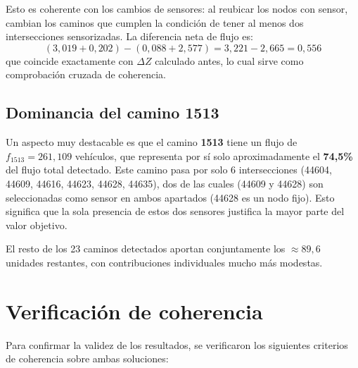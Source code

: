 \documentclass[12pt,a4paper]{article}
\begin{document}
Esto es coherente con los cambios de sensores: al reubicar los nodos con sensor, cambian los caminos que cumplen la condición de tener al menos dos intersecciones sensorizadas. La diferencia neta de flujo es:
\[
(3{,}019 + 0{,}202) - (0{,}088 + 2{,}577) = 3{,}221 - 2{,}665 = 0{,}556
\]
que coincide exactamente con $\Delta Z$ calculado antes, lo cual sirve como comprobación cruzada de coherencia.

\subsection{Dominancia del camino 1513}

Un aspecto muy destacable es que el camino \textbf{1513} tiene un flujo de $f_{1513} = 261{,}109$ vehículos, que representa por sí solo aproximadamente el \textbf{74,5\%} del flujo total detectado. Este camino pasa por solo 6 intersecciones (44604, 44609, 44616, 44623, 44628, 44635), dos de las cuales (44609 y 44628) son seleccionadas como sensor en ambos apartados (44628 es un nodo fijo). Esto significa que la sola presencia de estos dos sensores justifica la mayor parte del valor objetivo.

El resto de los 23 caminos detectados aportan conjuntamente los $\approx 89{,}6$ unidades restantes, con contribuciones individuales mucho más modestas.

\section{Verificación de coherencia}

Para confirmar la validez de los resultados, se verificaron los siguientes criterios de coherencia sobre ambas soluciones:
\end{document}
